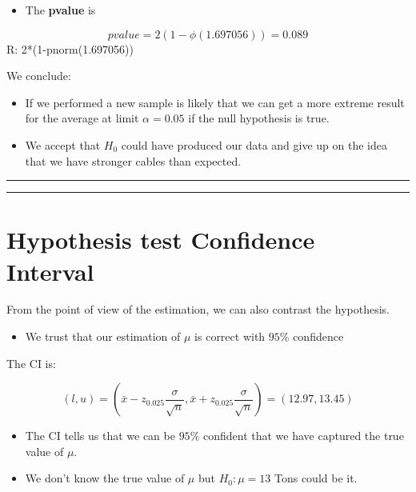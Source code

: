 \documentclass[
]{book}
\providecommand{\tightlist}{%
  \setlength{\itemsep}{0pt}\setlength{\parskip}{0pt}}
\begin{document}
\begin{itemize}
\tightlist
\item
  The \textbf{pvalue} is
\end{itemize}

\[pvalue=2 (1-\phi(1.697056))=0.089\]
R: 2*(1-pnorm(1.697056))

We conclude:

\begin{itemize}
\item
  If we performed a new sample is likely that we can get a more extreme result for the average at limit \(\alpha=0.05\) if the null hypothesis is true.
\item
  We accept that \(H_0\) could have produced our data and give up on the idea that we have stronger cables than expected.
\end{itemize}

\begin{center}\rule{0.5\linewidth}{0.5pt}\end{center}

\begin{center}\rule{0.5\linewidth}{0.5pt}\end{center}

\hypertarget{hypothesis-test-confidence-interval}{%
\section{Hypothesis test Confidence Interval}\label{hypothesis-test-confidence-interval}}

From the point of view of the estimation, we can also contrast the hypothesis.

\begin{itemize}
\tightlist
\item
  We trust that our estimation of \(\mu\) is correct with \(95\%\) confidence
\end{itemize}

The CI is:

\[(l,u)=(\bar{x}-z_{0.025} \frac{\sigma}{\sqrt{n}}, \bar{x}+z_{0.025} \frac{\sigma}{\sqrt{n}})= (12.97,13.45)\]

\begin{itemize}
\item
  The CI tells us that we can be \(95\%\) confident that we have captured the true value of \(\mu\).
\item
  We don't know the true value of \(\mu\) but \(H_0: \mu=13\) Tons could be it.
\end{itemize}
\end{document}
